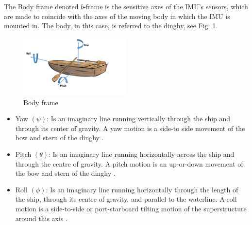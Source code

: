 The Body frame denoted $b$-frame is the sensitive axes of the IMU's sensors, which are made to coincide with the axes of the moving body in which the IMU is mounted in. The body, in this case, is referred to the dinghy, see Fig. \ref{Fig:body_frame}.

\begin{figure}[H]
\centering
\includegraphics[width=0.5\textwidth]{Figures/Euler_angle.pdf}
\caption{Body frame}
\label{Fig:body_frame}
\end{figure}
\begin{itemize}
\item Yaw $(\psi)$: Is an imaginary line running vertically through the ship and through its center of gravity. A yaw motion is a side-to side movement of the bow and stern of the dinghy \cite{SNAME}.
\item Pitch $(\theta)$: Is an imaginary line running horizontally across the ship and through the centre of gravity. A pitch motion is an up-or-down movement of the bow and stern of the dinghy \cite{SNAME}.
\item Roll $(\phi)$: Is an imaginary line running horizontally through the length of the ship, through its centre of gravity, and parallel to the waterline. A roll motion is a side-to-side or port-starboard tilting motion of the superstructure around this axis \cite{SNAME}.
\end{itemize}

